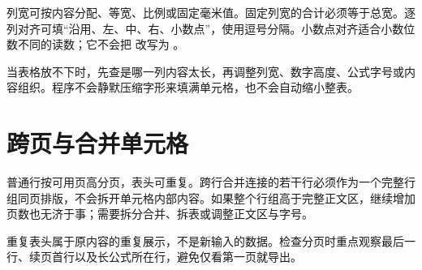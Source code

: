 列宽可按内容分配、等宽、比例或固定毫米值。固定列宽的合计必须等于总宽。逐列对齐可填“沿用、左、中、右、小数点”，使用逗号分隔。小数点对齐适合小数位数不同的读数；它不会把  改写为 。

当表格放不下时，先查是哪一列内容太长，再调整列宽、数字高度、公式字号或内容组织。程序不会静默压缩字形来填满单元格，也不会自动缩小整表。

\section{跨页与合并单元格}
普通行按可用页高分页，表头可重复。跨行合并连接的若干行必须作为一个完整行组同页排版，不会拆开单元格内部内容。如果整个行组高于完整正文区，继续增加页数也无济于事；需要拆分合并、拆表或调整正文区与字号。

重复表头属于原内容的重复展示，不是新输入的数据。检查分页时重点观察最后一行、续页首行以及长公式所在行，避免仅看第一页就导出。

